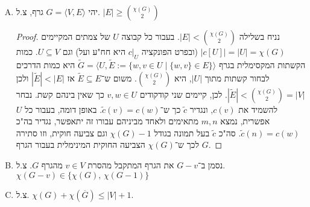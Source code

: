 \documentclass[]{article}
\newcommand\ra    {\rangle}
\newcommand\la    {\langle}
\newcommand\ol    {\overline}
\newcommand\ag    {\alpha}
\newcommand\tl    {\tilde}
\begin{document}
\begin{enumerate}[(A)]
\begin{proof}
			נפצל למקרים. 
			\begin{itemize}
				\item אם $E \neq \varnothing$ וגם קיים רכיב קשירות בו לפחות שני צמתים, אז קיימת קשת $e = \{w, v\} \in E$, ולכן $c(w) \neq c(v)$ (כאשר $c$ פונקציית הצביעה בעבור $\chi(G)$) וסה"כ $\chi(G) \ge 3$. מלמה 1, נדע $3\ag(G) \ge |V|$ כי נוכל "לשייך" לכל צומת ב־$U$ לכל היותר שני צמתים הצמודים אליו בצורה שתחסה את הגרף. סה"כ $\alpha(G)\chi(G) \ge |V|$ כדרוש. 
				\item אחרת, אם $V = \varnothing$ אז $|V| = 0 \ge \chi(G) \cdot \alpha(G)$ כי כפל חיובים הוא חיובי, וסיימנו
				\item אחרת, אם $E = \varnothing$, אז $\chi(G) = 1$ כי נוכל לצבוע כל צומת באותו הצבע (לא ייתכן מספר נמוך יותר כי אז $\chi(v) \in \emptyset$) וגם $\alpha(G) = |V|$ כי אף צומת לא תלוי בשני (ולא ייתכן יותר מזה כי אז $U \nsubseteq V$) ונוכל לבחור $U = V$. 
				\item אחרת, כל רכיבי הקשירות הם באורך לכל היותר שניים. אם כולם באורך אחד, אז $E = \emptyset$ וזו סתירה. אחרת, קיים רכיב קשירות באורך $2$ וממנו $\chi(G) = 2$, וברור כי $\ag(G) \ge n / 2$ (כי כל רכיבי הקשירות הם לכל היותר שניים) וסה"כ נעביר אגפים ונציב, $\chi(G)\ag(G) \ge |V|$ כדרוש. 
			\end{itemize}
			סה"כ הטענה הוכחה בכל המקרים האפשריים, כדרוש. 
		\end{proof}
		\item יהי $G = \la V, E \ra$ גרף, צ.ל. $|E| \ge \binom{\chi(G)}{2}$
		\begin{proof}
			נניח בשלילה $|E| < \binom{\chi(G)}{2}$. בעבור כל קבוצה $U$ של צמתים המקיימים $|c[U]| = |U| = \chi(G)$ (ובפרט הפונקציה $c|_U$ היא חח"ע ועל) וגם $U \subseteq V$. כמות הקשתות המקסימלית בגרף $\tl G = \la U, \tl E := \{w, v \in U \mid \{w, v\} \in E\} \ra$ היא כמות הדרכים לבחור קשתות מתוך $|U|$, היא $\binom{\chi(G)}{2}$. משום ש־$\tl E \subseteq E$ אז $|\tl E| < |E|$ ולכן $|\tl E| < \binom{\chi(G)}{2} = |V|$. לכן, קיימים שני קודקודים $v, w \in U$ כך שאין בינהם קשת. נבחר להשמיד את $c(v)$, ונגדיר $\tl c$ כך ש־$\tl c(v) = c(w)$. באופן דומה, בעבור כל $U$ אפשרית, נמצא $m, n$ מתאימים ולאחד מביניהם עבורו זה יתאפשר, נגדיר בה"כ $\tl c(n) = c(w)$. סה"כ $\tl c$ בעל תמונה בגודל $\chi(G) - 1$ וגם צביעה חוקית, וזו סתירה לכך ש־$\chi(G)$ הצביעה החוקית המינימלית בעבור הגרף $G$. 
		\end{proof}
		\item נסמן ב־$G - v$ את הגרף המתקבל מהסרת $v \in V$ מהגרף $G$. צ.ל. $\chi(G - v) \in \{\chi(G), \, \chi(G - 1)\}$
		\item צ.ל. $\chi(G) + \chi(\ol G) \le |V| + 1$. 
	\end{enumerate}
\end{document}
